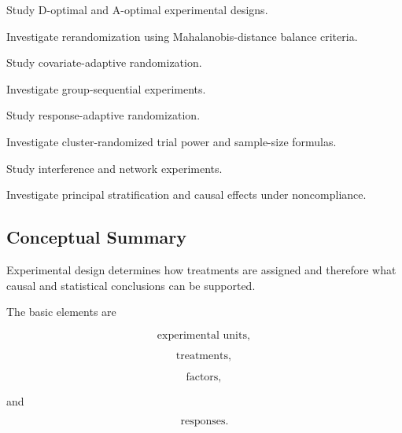 \begin{exercise}[4]
Study D-optimal and A-optimal experimental designs.
\end{exercise}

\begin{exercise}[4]
Investigate rerandomization using Mahalanobis-distance balance criteria.
\end{exercise}

\begin{exercise}[4]
Study covariate-adaptive randomization.
\end{exercise}

\begin{exercise}[4]
Investigate group-sequential experiments.
\end{exercise}

\begin{exercise}[4]
Study response-adaptive randomization.
\end{exercise}

\begin{exercise}[4]
Investigate cluster-randomized trial power and sample-size formulas.
\end{exercise}

\begin{exercise}[4]
Study interference and network experiments.
\end{exercise}

\begin{exercise}[4]
Investigate principal stratification and causal effects under
noncompliance.
\end{exercise}

\subsection{Conceptual Summary}
\label{subsec:experimental-design-summary}

Experimental design determines how treatments are assigned and therefore
what causal and statistical conclusions can be supported.

The basic elements are

\[
\boxed{
\text{experimental units},
}
\]

\[
\boxed{
\text{treatments},
}
\]

\[
\boxed{
\text{factors},
}
\]

and

\[
\boxed{
\text{responses}.
}
\]

